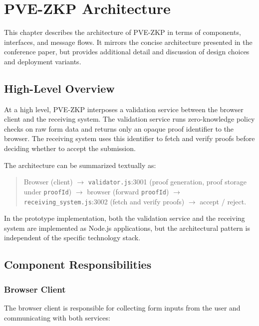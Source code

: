 
\chapter{PVE-ZKP Architecture}

This chapter describes the architecture of PVE-ZKP in terms of components,
interfaces, and message flows. It mirrors the concise architecture presented in
the conference paper, but provides additional detail and discussion of design
choices and deployment variants.

\section{High-Level Overview}

At a high level, PVE-ZKP interposes a validation service between the browser
client and the receiving system. The validation service runs zero-knowledge
policy checks on raw form data and returns only an opaque proof identifier to
the browser. The receiving system uses this identifier to fetch and verify
proofs before deciding whether to accept the submission.

The architecture can be summarized textually as:

\begin{quote}
Browser (client) $\rightarrow$ \texttt{validator.js}:3001 (proof generation,
proof storage under \texttt{proofId}) $\rightarrow$ browser (forward
\texttt{proofId}) $\rightarrow$ \texttt{receiving\_system.js}:3002 (fetch and
verify proofs) $\rightarrow$ accept / reject.
\end{quote}

In the prototype implementation, both the validation service and the receiving
system are implemented as Node.js applications, but the architectural pattern
is independent of the specific technology stack.

\section{Component Responsibilities}

\subsection{Browser Client}

The browser client is responsible for collecting form inputs from the user and
communicating with both services:

